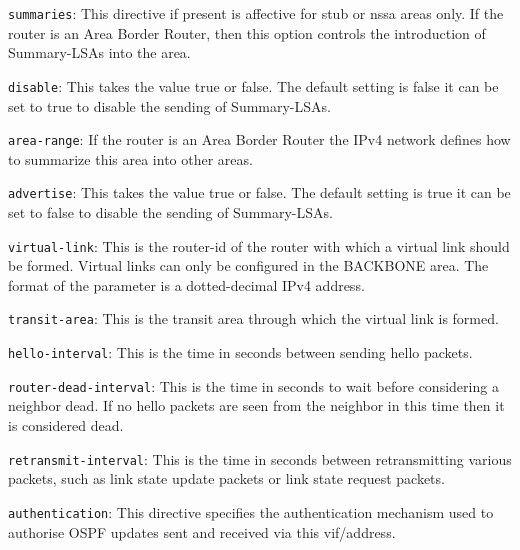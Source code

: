 \begin{description}
\begin{description}
\item{\tt summaries}: This directive if present is affective for
{\stt stub} or {\stt nssa} areas only. If the router is an Area Border
Router, then this option controls the introduction of Summary-LSAs into
the area.
\begin{description}
\item{\tt disable}: This takes the value {\stt true} or {\stt
false}. The default setting is {\stt false} it can be set to {\stt
true} to disable the sending of Summary-LSAs.
\end{description}
\end{description}

\begin{description}
\item{\tt area-range}: If the router is an Area Border Router the IPv4
network defines how to summarize this area into other areas.
\begin{description}
\item{\tt advertise}: This takes the value {\stt true} or {\stt
false}. The default setting is {\stt true} it can be set to {\stt
false} to disable the sending of Summary-LSAs. 
\end{description}
\end{description}

\begin{description}
\item{\tt virtual-link}: This is the {\stt router-id} of the router
with which a virtual link should be formed. Virtual links can only be
configured in the {\stt BACKBONE} area. The format of the parameter is
a dotted-decimal IPv4 address.
\begin{description}
\item{\tt transit-area}: This is the transit area through which the
virtual link is formed.
\item{\tt hello-interval}: This is the time in seconds between sending
hello packets.
\item{\tt router-dead-interval}: This is the time in seconds to wait before
considering a neighbor dead. If no hello packets are seen from the
neighbor in this time then it is considered dead.
\item{\tt retransmit-interval}: This is the time in seconds between
retransmitting various packets, such as link state update packets or
link state request packets.

\item{\tt authentication}: This directive specifies the authentication
mechanism used to authorise OSPF updates sent and received via this
vif/address.  


\end{description}
\end{description}
\end{description}
